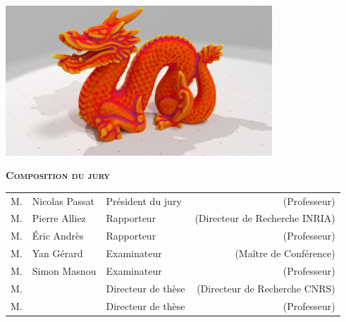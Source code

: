 \begin{titlepage}
\begin{addmargin}[-3.5cm]{-3cm}
\begin{center}
				\vfill

				\includegraphics[width=10cm]{images/Teaser}





        \vfill

        \textbf{\textsc{Composition du jury}}\\ \medskip

        \begin{table}[h]
	\begin{tabular}{@{}lllr@{}}
	\hline
	M. & Nicolas Passat & Président du jury & (Professeur) \\
	M. & Pierre Alliez  & Rapporteur  & (Directeur de Recherche INRIA) \\
	M. & Éric Andrès 	  & Rapporteur  & (Professeur) \\
	M. & Yan Gérard     & Examinateur & (Maître de Conférence) \\
	M. & Simon Masnou   & Examinateur & (Professeur) \\
	M. & \thesisFirstSupervisor & Directeur de thèse & (Directeur de Recherche CNRS) \\
	M. & \thesisSecondSupervisor & Directeur de thèse & (Professeur) \\
	\end{tabular}
	\end{table}


\end{center}
\end{addmargin}
\end{titlepage}
